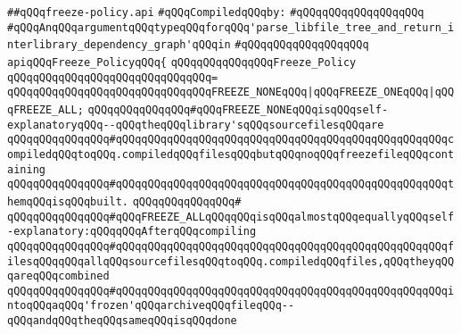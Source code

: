\label{src/app/makelib/parse/freeze-policy.api}
\verb|##qQQqfreeze-policy.api|\newline
\newline
\verb|#qQQqCompiledqQQqby:|\newline
\verb|#qQQqqQQqqQQqqQQqqQQq|\newline
\newline
\newline
\newline
\verb|#qQQqAnqQQqargumentqQQqtypeqQQqforqQQq'parse_libfile_tree_and_return_interlibrary_dependency_graph'qQQqin|\newline
\verb|#qQQqqQQqqQQqqQQqqQQq|\newline
\newline
\newline
\newline
\verb|apiqQQqFreeze_PolicyqQQq{|\newline
\newline
\verb|qQQqqQQqqQQqqQQqFreeze_Policy|\newline
\verb|qQQqqQQqqQQqqQQqqQQqqQQqqQQqqQQq=|\newline
\verb|qQQqqQQqqQQqqQQqqQQqqQQqqQQqqQQqFREEZE_NONEqQQq|\verb#|qQQqFREEZE_ONEqQQq|qQQqFREEZE_ALL;#\newline
\newline
\verb|qQQqqQQqqQQqqQQq#qQQqFREEZE_NONEqQQqisqQQqself-explanatoryqQQq--qQQqtheqQQqlibrary'sqQQqsourcefilesqQQqare|\newline
\verb|qQQqqQQqqQQqqQQq#qQQqqQQqqQQqqQQqqQQqqQQqqQQqqQQqqQQqqQQqqQQqqQQqqQQqcompiledqQQqtoqQQq.compiledqQQqfilesqQQqbutqQQqnoqQQqfreezefileqQQqcontaining|\newline
\verb|qQQqqQQqqQQqqQQq#qQQqqQQqqQQqqQQqqQQqqQQqqQQqqQQqqQQqqQQqqQQqqQQqqQQqthemqQQqisqQQqbuilt.|\newline
\verb|qQQqqQQqqQQqqQQq#|\newline
\verb|qQQqqQQqqQQqqQQq#qQQqFREEZE_ALLqQQqqQQqisqQQqalmostqQQqequallyqQQqself-explanatory:qQQqqQQqAfterqQQqcompiling|\newline
\verb|qQQqqQQqqQQqqQQq#qQQqqQQqqQQqqQQqqQQqqQQqqQQqqQQqqQQqqQQqqQQqqQQqqQQqfilesqQQqqQQqallqQQqsourcefilesqQQqtoqQQq.compiledqQQqfiles,qQQqtheyqQQqareqQQqcombined|\newline
\verb|qQQqqQQqqQQqqQQq#qQQqqQQqqQQqqQQqqQQqqQQqqQQqqQQqqQQqqQQqqQQqqQQqqQQqintoqQQqaqQQq'frozen'qQQqarchiveqQQqfileqQQq--qQQqandqQQqtheqQQqsameqQQqisqQQqdone|\newline
